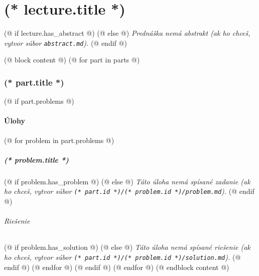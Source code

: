 \documentclass[12pt, twoside]{dgs}
\numberwithin{equation}{section}
\numberwithin{figure}{section}
\begin{document}
    \pagestyle{scholar}
    \part{(* lecture.title *)}%
    (@ if lecture.has_abstract @)
        \textit{}%
    (@ else @)
        \textit{Prednáška nemá abstrakt (ak ho chceš, vytvor súbor \texttt{abstract.md}).}
    (@ endif @)

    (@ block content @)
        (@ for part in parts @)
            \section{\texorpdfstring{(* part.title *)}{(* part.pdftitle|default(part.title) *)}}
                \label{(* lecture.id *)-(* part.id *)}
                
                (@ if part.problems @)
                    \subsection{Úlohy}
                    (@ for problem in part.problems @)
                        \subsubsection{(* problem.title *)}
                            \label{(* lecture.id *)-(* part.id *)-(* problem.id *)}
                            (@ if problem.has_problem @)
                            (@ else @)
                                \textit{Táto úloha nemá spísané zadanie
                                    (ak ho chceš, vytvor súbor \texttt{(* part.id *)/(* problem.id *)/problem.md}).}
                            (@ endif @)
                            \paragraph{Riešenie}
                            (@ if problem.has_solution @)
                            (@ else @)
                                \textit{Táto úloha nemá spísané riešenie
                                    (ak ho chceš, vytvor súbor \texttt{(* part.id *)/(* problem.id *)/solution.md}).}
                            (@ endif @)
                    (@ endfor @)
                (@ endif @)
        (@ endfor @)
    (@ endblock content @)
\end{document}
